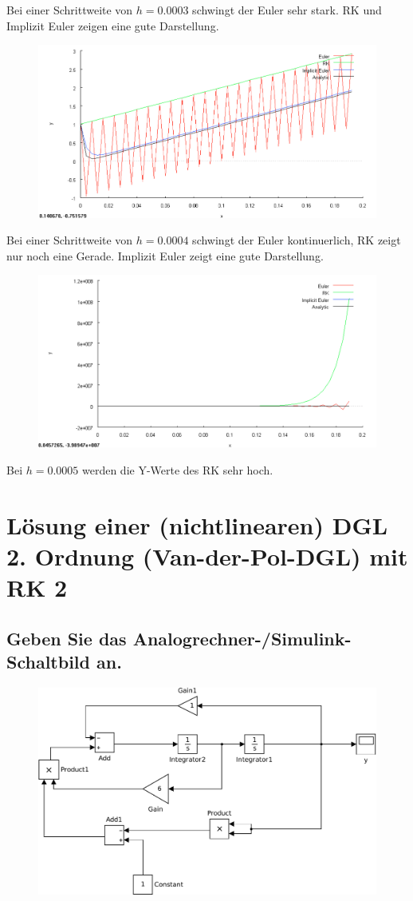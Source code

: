 \documentclass[10pt,a4paper]{article}
\begin{document}
Bei einer Schrittweite von $h = 0.0003$ schwingt der Euler sehr stark. RK und Implizit Euler zeigen eine gute Darstellung.
\begin{figure}[H]
\centering
\includegraphics[width=0.9\linewidth]{../screenshots/stiff 0004.png}
\end{figure}
Bei einer Schrittweite von $h = 0.0004$ schwingt der Euler kontinuerlich, RK zeigt nur noch eine Gerade. Implizit Euler zeigt eine gute Darstellung.
\begin{figure}[H]
\centering
\includegraphics[width=0.9\linewidth]{../screenshots/stiff 0005.png}
\end{figure}
Bei $h = 0.0005$ werden die Y-Werte des RK sehr hoch.

\section{Lösung einer (nichtlinearen) DGL 2. Ordnung (Van-der-Pol-DGL) mit RK 2}
\subsection{Geben Sie das Analogrechner-/Simulink-Schaltbild an.}
\begin{figure}[H]
\centering
\includegraphics[width=0.9\linewidth]{../screenshots/2}
\end{figure}
\end{document}

